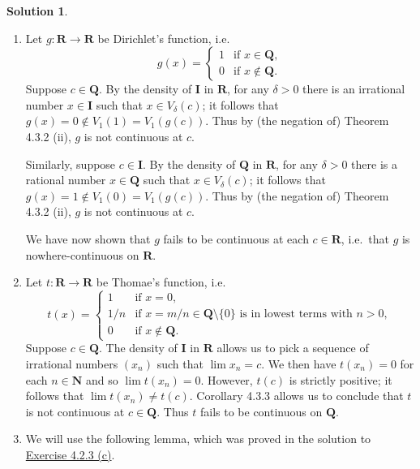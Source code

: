 \documentclass[12pt]{article}
\theoremstyle{definition}
\theoremstyle{exercise}
\theoremstyle{solution}
\newtheorem*{solution}{Solution}
\newcommand{\N}{\mathbf{N}}
\newcommand{\Q}{\mathbf{Q}}
\newcommand{\I}{\mathbf{I}}
\newcommand{\R}{\mathbf{R}}
\begin{document}
\begin{solution}
    \begin{enumerate}
        \item Let \( g : \R \to \R \) be Dirichlet's function, i.e.\
        \[
            g(x) = \begin{cases}
                1 & \text{if } x \in \Q, \\
                0 & \text{if } x \not\in \Q.
            \end{cases}
        \]
        Suppose \( c \in \Q \). By the density of \( \I \) in \( \R \), for any \( \delta > 0 \) there is an irrational number \( x \in \I \) such that \( x \in V_{\delta}(c) \); it follows that \( g(x) = 0 \not\in V_1(1) = V_1(g(c)) \). Thus by (the negation of) Theorem 4.3.2 (ii), \( g \) is not continuous at \( c \).

        Similarly, suppose \( c \in \I \). By the density of \( \Q \) in \( \R \), for any \( \delta > 0 \) there is a rational number \( x \in \Q \) such that \( x \in V_{\delta}(c) \); it follows that \( g(x) = 1 \not\in V_1(0) = V_1(g(c)) \). Thus by (the negation of) Theorem 4.3.2 (ii), \( g \) is not continuous at \( c \).

        We have now shown that \( g \) fails to be continuous at each \( c \in \R \), i.e.\ that \( g \) is nowhere-continuous on \( \R \).

        \item Let \( t : \R \to \R \) be Thomae's function, i.e.\
        \[
            t(x) = \begin{cases}
                1 & \text{if } x = 0, \\
                1/n & \text{if } x = m/n \in \Q \setminus \{ 0 \} \text{ is in lowest terms with } n > 0, \\
                0 & \text{if } x \not\in \Q.
            \end{cases}
        \]
        Suppose \( c \in \Q \). The density of \( \I \) in \( \R \) allows us to pick a sequence of irrational numbers \( (x_n) \) such that \( \lim x_n = c \). We then have \( t(x_n) = 0 \) for each \( n \in \N \) and so \( \lim t(x_n) = 0 \). However, \( t(c) \) is strictly positive; it follows that \( \lim t(x_n) \neq t(c) \). Corollary 4.3.3 allows us to conclude that \( t \) is not continuous at \( c \in \Q \). Thus \( t \) fails to be continuous on \( \Q \).

        \item We will use the following lemma, which was proved in the solution to \href{https://lew98.github.io/Mathematics/UA_Section_4_2_Exercises.pdf}{Exercise 4.2.3 (c)}.


\end{enumerate}
\end{solution}
\end{document}
